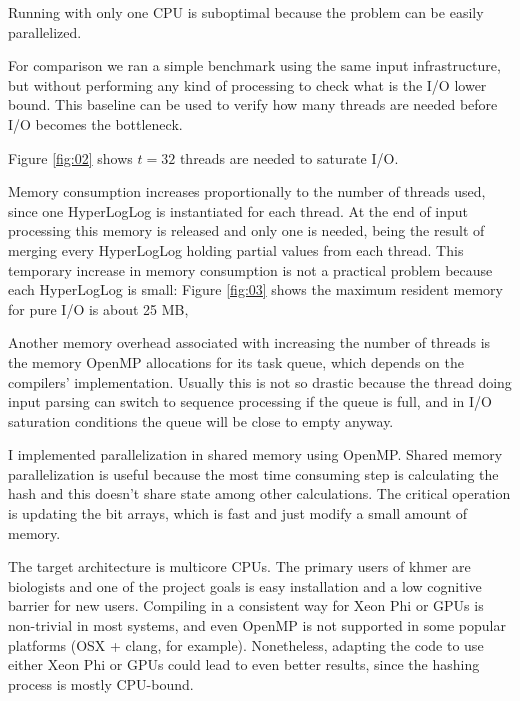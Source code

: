 \documentclass{bioinfo}
\begin{document}

Running with only one CPU is suboptimal because the problem can be easily parallelized.

For comparison we ran a simple benchmark using the same input infrastructure,
but without performing any kind of processing to check what is the I/O lower bound.
This baseline can be used to verify how many threads are needed before I/O becomes the bottleneck.

Figure \ref{fig:02} shows $t=32$ threads are needed to saturate I/O.



Memory consumption increases proportionally to the number of threads used,
since one HyperLogLog is instantiated for each thread.
At the end of input processing this memory is released and only one is needed,
being the result of merging every HyperLogLog holding partial values from each thread.
This temporary increase in memory consumption is not a practical problem because each HyperLogLog is small:
Figure \ref{fig:03} shows the maximum resident memory for pure I/O is about 25 MB,

Another memory overhead associated with increasing the number of threads is the memory OpenMP allocations for its task queue,
which depends on the compilers' implementation.    %
Usually this is not so drastic because the thread doing input parsing can switch to sequence processing if the queue is full,
and in I/O saturation conditions the queue will be close to empty anyway.




I implemented parallelization in shared memory using OpenMP.
Shared memory parallelization is useful because the most time consuming
step is calculating the hash and this doesn't share state among other calculations.
The critical operation is updating the bit arrays,
which is fast and just modify a small amount of memory.

The target architecture is multicore CPUs.
The primary users of khmer are biologists and one of the project goals is easy installation and a low cognitive barrier for new users.
Compiling in a consistent way for Xeon Phi or GPUs is non-trivial in most systems,
and even OpenMP is not supported in some popular platforms (OSX + clang, for example).
Nonetheless,
adapting the code to use either Xeon Phi or GPUs could lead to even better results,
since the hashing process is mostly CPU-bound.
\end{document}

